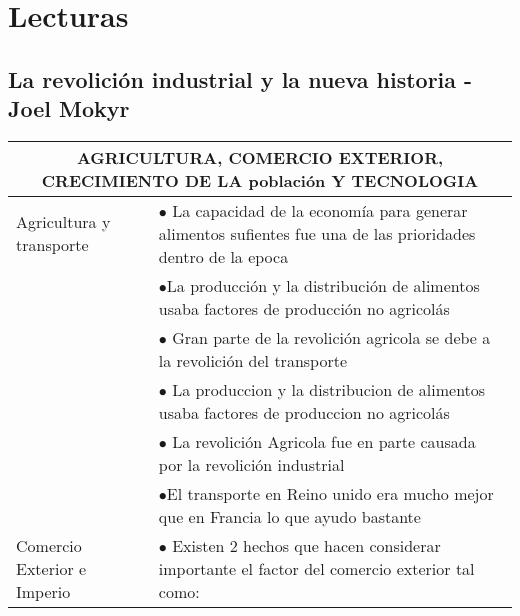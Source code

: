 \section{Lecturas}
\subsection{La revolición industrial y la nueva historia - Joel Mokyr}

\begingroup
\setlength{\tabcolsep}{12pt} %
\renewcommand{\arraystretch}{1.5} %
\begin{tabular}{p{3cm}|p{12cm}}
  \multicolumn{2}{c}{AGRICULTURA, COMERCIO EXTERIOR, CRECIMIENTO DE LA población Y TECNOLOGIA}                                                                                                             \\ \hline
  Agricultura y transporte     & $\bullet$ La capacidad de la economía para generar alimentos sufientes fue una de las prioridades dentro de la epoca                                                      \\
                               & $\bullet$La producción y la distribución de alimentos usaba factores de producción no agricolás                                                                           \\
                               & $\bullet$ Gran parte de la revolición agricola se debe a la revolición del transporte                                                                                     \\
                               & $\bullet$ La produccion y la distribucion de alimentos usaba factores de produccion no agricolás                                                                          \\
                               & $\bullet$ La revolición Agricola fue en parte causada por la revolición industrial                                                                                        \\
                               & $\bullet$El transporte en Reino unido era mucho mejor que en Francia lo que ayudo bastante                                                                                \\ \hline
  Comercio  Exterior e Imperio & $\bullet$ Existen 2 hechos que hacen considerar importante el factor del comercio exterior tal como:                                                                      \\

\end{tabular}
